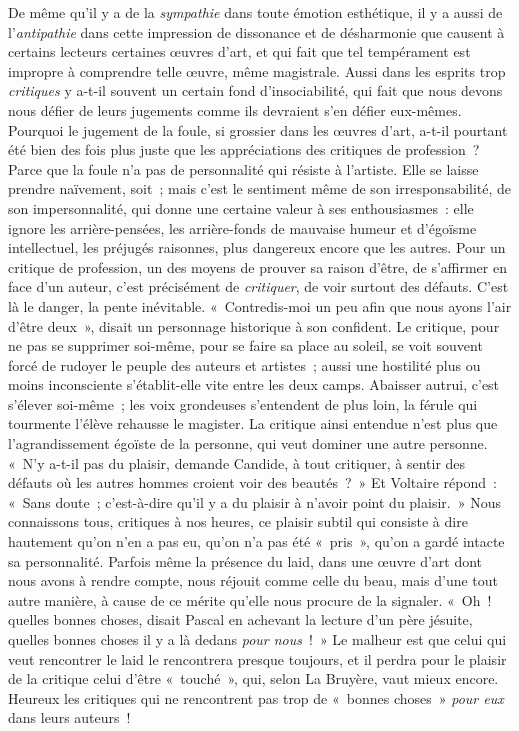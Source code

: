 \documentclass[french,twoside]{book} %
\begin{document}
De même qu’il y a de la \emph{sympathie} dans toute émotion esthétique, il y a aussi de l’\emph{antipathie} dans cette impression de dissonance et de désharmonie que causent à certains lecteurs certaines œuvres d’art, et qui fait que tel tempérament est impropre à comprendre telle œuvre, même magistrale. Aussi dans les esprits trop \emph{critiques} y a-t-il souvent un certain fond d’insociabilité, qui fait que nous devons nous défier de leurs jugements comme ils devraient s’en défier eux-mêmes. Pourquoi le jugement de la foule, si grossier dans les œuvres d’art, a-t-il pourtant été bien des fois plus juste que les appréciations des critiques de profession ? Parce que la foule n’a pas de personnalité qui résiste à l’artiste. Elle se laisse prendre naïvement, soit ; mais c’est le sentiment même de son irresponsabilité, de son impersonnalité, qui donne une certaine valeur à ses enthousiasmes : elle ignore les arrière-pensées, les arrière-fonds de mauvaise humeur et d’égoïsme intellectuel, les préjugés raisonnes, plus dangereux encore que les autres. Pour un critique de profession, un des moyens de prouver sa raison d’être, de s’affirmer en face d’un auteur, c’est précisément de \emph{critiquer}, de voir surtout des défauts. C’est là le danger, la pente inévitable. « Contredis-moi un peu afin que nous ayons l’air d’être deux », disait un personnage historique à son confident. Le critique, pour ne pas se supprimer soi-même, pour se faire sa place au soleil, se voit souvent forcé de rudoyer le peuple des auteurs et artistes ; aussi une hostilité plus ou moins inconsciente s’établit-elle vite entre les deux camps. Abaisser autrui, c’est s’élever soi-même ; les voix grondeuses s’entendent de plus loin, la férule qui tourmente l’élève rehausse le magister. La critique ainsi entendue n’est plus que l’agrandissement égoïste de la personne, qui veut dominer une autre personne. « N’y a-t-il pas du plaisir, demande Candide, à tout critiquer, à sentir des défauts où les autres hommes croient voir des beautés ? » Et Voltaire répond : « Sans doute ; c’est-à-dire qu’il y a du plaisir à n’avoir point du plaisir. » Nous connaissons tous, critiques à nos heures, ce plaisir subtil qui consiste à dire hautement qu’on n’en a pas eu, qu’on n’a pas été « pris », qu’on a gardé intacte sa personnalité. Parfois même la présence du laid, dans une œuvre d’art dont nous avons à rendre compte, nous réjouit comme celle du beau, mais d’une tout autre manière, à cause de ce mérite qu’elle nous procure de la signaler. « Oh ! quelles bonnes choses, disait Pascal en achevant la lecture d’un père jésuite, quelles bonnes choses il y a là dedans \emph{pour nous} ! » Le malheur est que celui qui veut rencontrer le laid le rencontrera presque toujours, et il perdra pour le plaisir de la critique celui d’être « touché », qui, selon La Bruyère, vaut mieux encore. Heureux les critiques qui ne rencontrent pas trop de « bonnes choses » \emph{pour eux} dans leurs auteurs !\par
\end{document}
